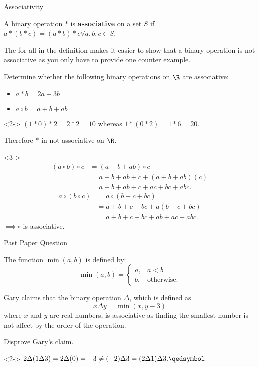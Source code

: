 \documentclass[8pt]{beamer}
\begin{document}
\begin{frame}{Associativity}
	\begin{definition}
		A binary operation $*$ is \textbf{associative} on  a set $S$ if  $a*(b*c)=(a*b)*c \forall a,b,c \in S$.
	\end{definition}

	\alert<1>{The for all in the definition makes it easier to show that a binary operation is not associative as you only have to provide one counter example.}

	\begin{problem}
		Determine whether the following binary operations on $\R$ are associative:
		\begin{itemize}
			\item $a*b=2a+3b$
			\item  $a \circ b = a + b + ab$
		\end{itemize}
	\end{problem}

	\begin{solution}<2->
		$(1*0)*2=2*2=10$ whereas  $1*(0*2)=1*6=20$.

		Therefore $*$ in not associative on  $ \R$.

	\end{solution}
	\begin{solution}<3->
		\begin{align*}
			(a \circ b)\circ c &= (a+b+ab)\circ c \\
					   &= a+b+ab+c+(a+b+ab)(c) \\
					   &= a +b+ab+c+ac+bc+abc 
		.\end{align*}
		\begin{align*}
			a \circ(b\circ c) &= a \circ (b+c+bc) \\
					  &= a+b+c+bc+a(b+c+bc) \\
					  &= a+b+c+bc+ab+ac+abc 
		.\end{align*}
$\implies \circ$ is associative.

	\end{solution}
\end{frame}

\begin{frame}{Past Paper Question}
	\begin{problem}
		The function $\min (a,b)$ is defined by:  \[
			\min(a,b)= \begin{cases}
				a, & a < b \\
				b, & \text{otherwise.}
			\end{cases}
		\]

		Gary claims that the binary operation $\Delta$, which is defined as  \[
			x \Delta y = \min(x,y-3)
		\] 
		where $x$ and  $y$ are real numbers, is associative as finding the smallest number is not affect by the order of the operation.

		Disprove Gary's claim.
	\end{problem}
	\begin{solution}<2->
		$2\Delta(1\Delta 3)=2\Delta (0) = -3 \neq (-2)\Delta 3=(2\Delta 1) \Delta 3. \qedsymbol$ 
	\end{solution}
\end{frame}
\end{document}
